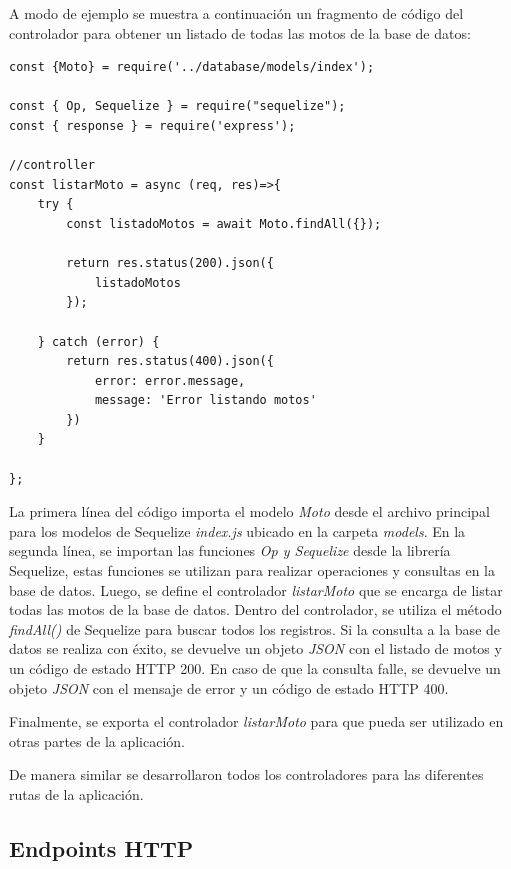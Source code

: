 A modo de ejemplo se muestra a continuación un fragmento de código del controlador para obtener un listado de todas las motos de la base de datos:

\begin{lstlisting}[label=cod:routesot,caption=Código de controlador para obtener listado de motos.]
const {Moto} = require('../database/models/index');

const { Op, Sequelize } = require("sequelize");
const { response } = require('express');

//controller
const listarMoto = async (req, res)=>{
    try {
        const listadoMotos = await Moto.findAll({});
        
        return res.status(200).json({
            listadoMotos
        }); 

    } catch (error) {
        return res.status(400).json({
            error: error.message,
            message: 'Error listando motos'
        })
    }
    
};
\end{lstlisting}

La primera línea del código importa el modelo \textit{Moto} desde el archivo principal para los modelos de Sequelize \textit{index.js} ubicado en la carpeta \textit{models}. En la segunda línea, se importan las funciones \textit{Op y Sequelize} desde la librería Sequelize, estas funciones se utilizan para realizar operaciones y consultas en la base de datos. Luego, se define el controlador \textit{listarMoto} que se encarga de listar todas las motos de la base de datos. Dentro del controlador, se utiliza el método \textit{findAll()} de Sequelize para buscar todos los registros. Si la consulta a la base de datos se realiza con éxito, se devuelve un objeto \textit{JSON} con el listado de motos y un código de estado HTTP 200. En caso de que la consulta falle, se devuelve un objeto \textit{JSON} con el mensaje de error y un código de estado HTTP 400.

Finalmente, se exporta el controlador \textit{listarMoto} para que pueda ser utilizado en otras partes de la aplicación.

De manera similar se desarrollaron todos los controladores para las diferentes rutas de la aplicación. 

\subsection{Endpoints HTTP}
\label{subsec:apiendpointshttp}

